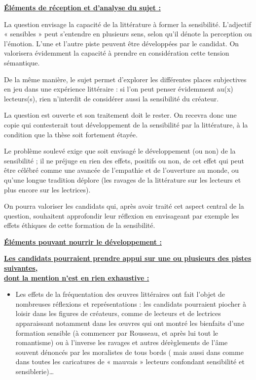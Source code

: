 		{%
\textbf{\underline{Éléments de réception et d’analyse du sujet :}}

La question envisage la capacité de la littérature à former la sensibilité. L’adjectif
« sensibles » peut s’entendre en plusieurs sens, selon qu’il dénote la perception ou
l’émotion. L’une et l’autre piste peuvent être développées par le candidat. On
valorisera évidemment la capacité à prendre en considération cette tension
sémantique.

De la même manière, le sujet permet d’explorer les différentes places subjectives en
jeu dans une expérience littéraire : si l’on peut penser évidemment au(x) lecteurs(s),
rien n’interdit de considérer aussi la sensibilité du créateur.

La question est ouverte et son traitement doit le rester. On recevra donc une copie qui
contesterait tout développement de la sensibilité par la littérature, à la condition que la
thèse soit fortement étayée.

Le problème soulevé exige que soit envisagé le développement (ou non) de la
sensibilité ; il ne préjuge en rien des effets, positifs ou non, de cet effet qui peut être
célébré comme une avancée de l’empathie et de l’ouverture au monde, ou qu’une
longue tradition déplore (les ravages de la littérature sur les lecteurs et plus encore sur
les lectrices).

On pourra valoriser les candidats qui, après avoir traité cet aspect central de la
question, souhaitent approfondir leur réflexion en envisageant par exemple les effets
éthiques de cette formation de la sensibilité.

\textbf{\underline{Éléments pouvant nourrir le développement :}}

\textbf{\underline{Les candidats pourraient prendre appui sur une ou plusieurs des pistes suivantes,}\\\underline{dont la mention n’est en rien exhaustive :}}

\begin{itemize}
\item Les effets de la fréquentation des œuvres littéraires ont fait l’objet de
nombreuses réflexions et représentations : les candidats pourraient piocher
à loisir dans les figures de créateurs, comme de lecteurs et de lectrices
apparaissant notamment dans les œuvres qui ont montré les bienfaits d’une
formation sensible (à commencer par Rousseau, et après lui tout le
romantisme) ou à l’inverse les ravages et autres dérèglements de l’âme
souvent dénoncés par les moralistes de tous bords ( mais aussi dans
 comme dans toutes les caricatures de « mauvais »
lecteurs confondant sensibilité et sensiblerie)…


\end{itemize}}

